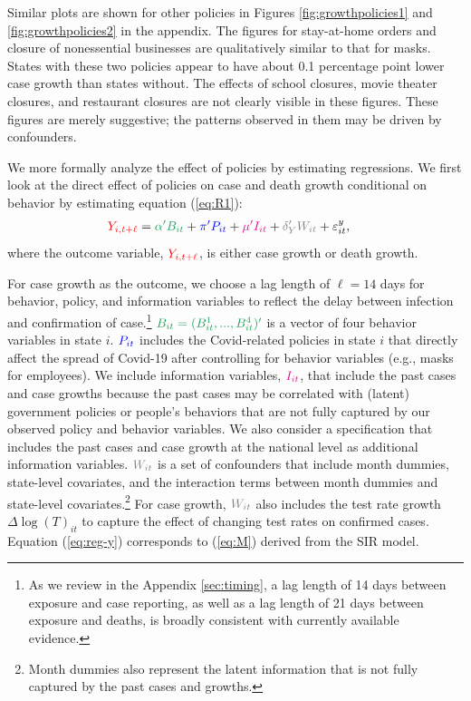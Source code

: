\documentclass[11pt,reqno,letter]{amsart}
\theoremstyle{definition}
\def\bcolor{\color{ForestGreen}}
\def\pcolor{\color{blue}}
\def\icolor{\color{magenta}}
\def\wcolor{\color{gray}}
\def\ycolor{\color{red}}
\begin{document}
Similar plots are shown for other policies in Figures
\ref{fig:growthpolicies1} and \ref{fig:growthpolicies2} in the
appendix. The  figures for stay-at-home orders and closure
of nonessential businesses are qualitatively similar to that for
masks. States with these two policies appear to have about 0.1 percentage point lower
case growth  than states without. The effects of school closures, movie theater closures, and
restaurant closures are not clearly visible in these figures. These
figures are merely suggestive; the patterns observed in them may be
driven by confounders.

We more formally analyze the effect of policies by estimating
regressions. We first look at the direct effect of policies on case and death growth
conditional on behavior by estimating equation (\ref{eq:R1}):
\begin{align}
  {\ycolor  Y_{i,t+\ell}}
  & = {\bcolor \alpha ' B_{it}} + {\pcolor\pi 'P_{it}} + {\icolor \mu'I_{it}} +  {\wcolor\delta_Y 'W_{it}}  + \varepsilon^y_{it},
  \label{eq:reg-y}
\end{align}
where the outcome variable, $\ycolor Y_{i,t+\ell}$, is either case growth  or death growth.

For case growth as the outcome, we choose a lag length of $\ell=14$ days for behavior, policy, and information variables to reflect the delay between infection and
confirmation of case.\footnote{As we review in the Appendix \ref{sec:timing},
  a lag length of 14 days between exposure and case reporting, as well as a lag length of 21 days between exposure and deaths, is broadly consistent with currently
  available evidence.  }   $\bcolor B_{it}=(B_{it}^1,...,B_{it}^4)'$ is a vector of four behavior
variables  in state $i$. $\pcolor P_{it}$ includes the Covid-related policies
in state $i$  that directly affect the spread of Covid-19
after controlling for behavior variables (e.g., masks for employees).
We include information variables,  $\icolor I_{it}$, that include the past cases and case growths
because  the past cases may be
correlated with (latent) government  policies or people's behaviors
that are not fully captured by our observed policy and behavior
variables. We also consider a specification that includes the past cases and case growth at the national level as additional information variables. $\wcolor W_{it}$ is a set of confounders that include month dummies, state-level covariates,  and the interaction terms between month dummies and state-level covariates.\footnote{Month dummies also represent the latent information that is not fully captured by the past cases and growths.}
For case growth, $\wcolor W_{it}$ also includes the  test rate growth  $\Delta \log(T)_{it}$  to capture the effect of changing test rates on confirmed cases.
Equation (\ref{eq:reg-y}) corresponds to (\ref{eq:M})  derived from the SIR model.
\end{document}
